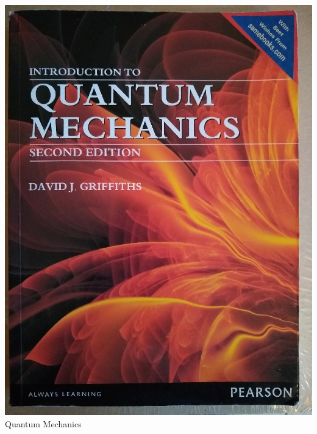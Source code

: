 \documentclass[t]{beamer}
\newcommand{\htarget}[2]{\hypertarget{#1}{#2}}
\begin{document}
\begin{frame}\htarget{QM}{} \begin{center}
\includegraphics[height=0.8\textheight]{Quantum_Mechanics_mini.jpg} \\
Quantum Mechanics
\end{center} \end{frame}
\end{document}
